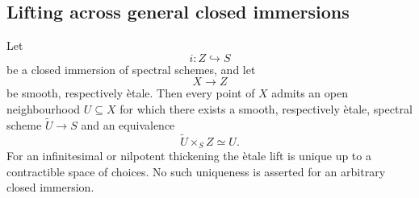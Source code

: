 \subsection{Lifting across general closed immersions}

\begin{theorem}
\label{thm:infinitesimal-lifting-smooth-etale}
Let
\[
    i
    \colon
    Z
    \hookrightarrow
    S
\]
be a closed immersion of spectral schemes, and let
\[
    X
    \longrightarrow
    Z
\]
be smooth, respectively \`etale. Then every point of $X$ admits an open
neighbourhood $U\subseteq X$ for which there exists a smooth,
respectively \`etale, spectral scheme $\widetilde U\to S$ and an
equivalence
\[
    \widetilde U\times_SZ
    \simeq
    U.
\]
For an infinitesimal or nilpotent thickening the \`etale lift is unique
up to a contractible space of choices. No such uniqueness is asserted for
an arbitrary closed immersion.
\end{theorem}

